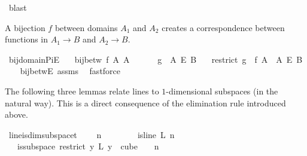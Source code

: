 \begin{isabellebody}
\ blast\isanewline
{}\isamarkupfalse%
%
\endisatagproof
{\isafoldproof}%
%
\isadelimproof
%
\endisadelimproof
%
\begin{isamarkuptext}%
A bijection $f$ between domains $A_1$ and $A_2$ creates a correspondence between
functions in $A_1 \rightarrow B$ and $A_2 \rightarrow B$.%
\end{isamarkuptext}\isamarkuptrue%
\isamarkupfalse%
\ bij{\isacharunderscore}{\kern0pt}domain{\isacharunderscore}{\kern0pt}PiE{\isacharcolon}{\kern0pt}\isanewline
\ \ \ {\isachardoublequoteopen}bij{\isacharunderscore}{\kern0pt}betw\ f\ A{}\ A{}{\isachardoublequoteclose}\ \isanewline
\ \ \ \ \ {\isachardoublequoteopen}g\ {\isasymin}\ A{}\ {\isasymrightarrow}\isactrlsub E\ B{\isachardoublequoteclose}\isanewline
\ \ \ {\isachardoublequoteopen}{\isacharparenleft}{\kern0pt}restrict\ {\isacharparenleft}{\kern0pt}g\ {\isasymcirc}\ f{\isacharparenright}{\kern0pt}\ A{}{\isacharparenright}{\kern0pt}\ {\isasymin}\ A{}\ {\isasymrightarrow}\isactrlsub E\ B{\isachardoublequoteclose}\isanewline
%
\isadelimproof
\ \ %
\endisadelimproof
%
\isatagproof
{}\isamarkupfalse%
\ bij{\isacharunderscore}{\kern0pt}betwE\ assms\ \isamarkupfalse%
\ fastforce%
\endisatagproof
{\isafoldproof}%
%
\isadelimproof
%
\endisadelimproof
%
\begin{isamarkuptext}%
The following three lemmas relate lines to $1$-dimensional subspaces (in the natural
way). This is a direct consequence of the elimination rule  introduced
above.%
\end{isamarkuptext}\isamarkuptrue%
\isamarkupfalse%
\ line{\isacharunderscore}{\kern0pt}is{\isacharunderscore}{\kern0pt}dim{}{\isacharunderscore}{\kern0pt}subspace{\isacharunderscore}{\kern0pt}t{\isacharunderscore}{\kern0pt}{}{\isacharcolon}{\kern0pt}\ \isanewline
\ \ \ {\isachardoublequoteopen}n\ {\isachargreater}{\kern0pt}\ {}{\isachardoublequoteclose}\ \isanewline
\ \ \ \ \ {\isachardoublequoteopen}is{\isacharunderscore}{\kern0pt}line\ L\ n\ {}{\isachardoublequoteclose}\isanewline
\ \ \ {\isachardoublequoteopen}is{\isacharunderscore}{\kern0pt}subspace\ {\isacharparenleft}{\kern0pt}restrict\ {\isacharparenleft}{\kern0pt}{\isasymlambda}y{\isachardot}{\kern0pt}\ L\ {\isacharparenleft}{\kern0pt}y\ {}{\isacharparenright}{\kern0pt}{\isacharparenright}{\kern0pt}\ {\isacharparenleft}{\kern0pt}cube\ {}\ {}{\isacharparenright}{\kern0pt}{\isacharparenright}{\kern0pt}\ {}\ n\ {}{\isachardoublequoteclose}\isanewline

\end{isabellebody}
